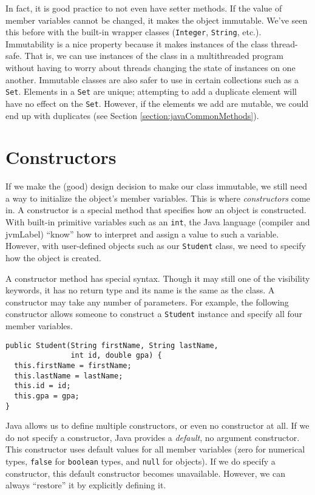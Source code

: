 In fact, it is good practice to not even have setter methods.  If 
the value of member variables cannot be changed, it makes the object
\gls{immutable}.  We've seen this before with the built-in wrapper
classes (\texttt{Integer}, \texttt{String}, etc.).
Immutability is a nice property because it makes instances of the
class thread-safe.  That is, we can use instances of the class in a 
multithreaded program without having to worry about threads changing
the state of instances on one another.  Immutable classes are also
safer to use in certain collections such as a \texttt{Set}.
Elements in a \texttt{Set} are unique; attempting to 
add a duplicate element will have no effect on the \texttt{Set}.
However, if the elements we add are mutable, we could end up
with duplicates (see Section \ref{section:javaCommonMethods}).

\section{Constructors}

If we make the (good) design decision to make our class immutable,
we still need a way to initialize the object's member variables.  
This is where 
\emph{constructors} come in.  A constructor is a special method
that specifies how an object is constructed.  With built-in primitive
variables such as an \texttt{int}, the Java language
(compiler and \gls{jvmLabel}) ``know'' how to interpret and
assign a value to such a variable.  However, with user-defined
objects such as our \texttt{Student} class, we need
to specify how the object is created.

A constructor method has special syntax.  Though it may still 
one of the visibility keywords, it has no return type and its
name is the same as the class.  A constructor may take any
number of parameters.  For example, the following constructor
allows someone to construct a \texttt{Student} instance
and specify all four member variables.

\begin{verbatim}
public Student(String firstName, String lastName, 
               int id, double gpa) {
  this.firstName = firstName;
  this.lastName = lastName;
  this.id = id;
  this.gpa = gpa;
}
\end{verbatim}

Java allows us to define multiple constructors, or even no constructor
at all.  If we do not specify a constructor, Java provides
a \emph{default}, no argument constructor.  This 
constructor uses default values for all member variables (zero
for numerical types, \texttt{false} for \texttt{boolean}
types, and \texttt{null} for objects).  If we do specify
a constructor, this default constructor becomes unavailable.  However,
we can always ``restore'' it by explicitly defining it.

